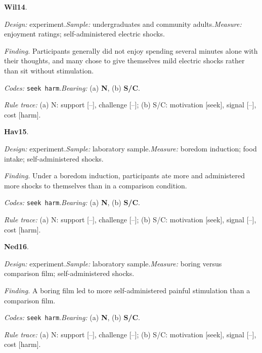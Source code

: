 \noindent\textbf{Wil14}\enspace \citet{WilsonEtAl2014}.\par
{\small\noindent\textit{Design:} experiment.\quad \textit{Sample:} undergraduates and community adults.\quad \textit{Measure:} enjoyment ratings; self-administered electric shocks.\par
\noindent\textit{Finding.} Participants generally did not enjoy spending several minutes alone with their thoughts, and many chose to give themselves mild electric shocks rather than sit without stimulation.\par
\noindent\textit{Codes:} \texttt{seek harm}.\quad \textit{Bearing:} (a) \textbf{N}, (b) \textbf{S/C}.\par
\noindent\textit{Rule trace:} (a) N: support {[}--{]}, challenge {[}--{]}; (b) S/C: motivation {[}seek{]}, signal {[}--{]}, cost {[}harm{]}.\par}
\medskip
{}
\noindent\textbf{Hav15}\enspace \citet{Havermans2015}.\par
{\small\noindent\textit{Design:} experiment.\quad \textit{Sample:} laboratory sample.\quad \textit{Measure:} boredom induction; food intake; self-administered shocks.\par
\noindent\textit{Finding.} Under a boredom induction, participants ate more and administered more shocks to themselves than in a comparison condition.\par
\noindent\textit{Codes:} \texttt{seek harm}.\quad \textit{Bearing:} (a) \textbf{N}, (b) \textbf{S/C}.\par
\noindent\textit{Rule trace:} (a) N: support {[}--{]}, challenge {[}--{]}; (b) S/C: motivation {[}seek{]}, signal {[}--{]}, cost {[}harm{]}.\par}
\medskip
{}
\noindent\textbf{Ned16}\enspace \citet{Nederkoorn2016}.\par
{\small\noindent\textit{Design:} experiment.\quad \textit{Sample:} laboratory sample.\quad \textit{Measure:} boring versus comparison film; self-administered shocks.\par
\noindent\textit{Finding.} A boring film led to more self-administered painful stimulation than a comparison film.\par
\noindent\textit{Codes:} \texttt{seek harm}.\quad \textit{Bearing:} (a) \textbf{N}, (b) \textbf{S/C}.\par
\noindent\textit{Rule trace:} (a) N: support {[}--{]}, challenge {[}--{]}; (b) S/C: motivation {[}seek{]}, signal {[}--{]}, cost {[}harm{]}.\par}
